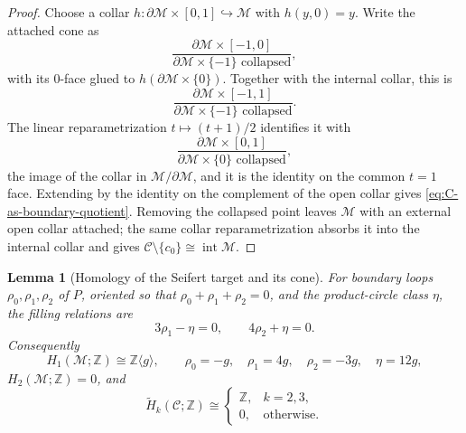 \documentclass[11pt,letterpaper]{article}
\numberwithin{equation}{section}
\newtheorem{lemma}[theorem]{Lemma}
\theoremstyle{definition}
\theoremstyle{remark}
\newcommand{\Z}{\mathbb Z}
\begin{document}
\begin{proof}
Choose a collar
\(h:\partial\mathcal M\times[0,1]\hookrightarrow\mathcal M\) with
\(h(y,0)=y\).  Write the attached cone as
\[
 \frac{\partial\mathcal M\times[-1,0]}
      {\partial\mathcal M\times\{-1\}\text{ collapsed}},
\]
with its \(0\)-face glued to \(h(\partial\mathcal M\times\{0\})\).
Together with the internal collar, this is
\[
 \frac{\partial\mathcal M\times[-1,1]}
      {\partial\mathcal M\times\{-1\}\text{ collapsed}}.
\]
The linear reparametrization \(t\mapsto(t+1)/2\) identifies it with
\[
 \frac{\partial\mathcal M\times[0,1]}
      {\partial\mathcal M\times\{0\}\text{ collapsed}},
\]
the image of the collar in
\(\mathcal M/\partial\mathcal M\), and it is the identity on the common
\(t=1\) face.  Extending by the identity on the complement of the open
collar gives \cref{eq:C-as-boundary-quotient}.  Removing the collapsed
point leaves \(\mathcal M\) with an external open collar attached; the
same collar reparametrization absorbs it into the internal collar and
gives \(\mathcal C\setminus\{c_0\}\cong\operatorname{int}\mathcal M\).
\end{proof}

\begin{lemma}[Homology of the Seifert target and its cone]
\label{lem:C-homology}
For boundary loops $\rho_0,\rho_1,\rho_2$ of $P$, oriented so that
$\rho_0+\rho_1+\rho_2=0$, and the product-circle class $\eta$, the filling
relations are
\begin{equation}
 3\rho_1-\eta=0,\qquad4\rho_2+\eta=0.
 \label{eq:meridian-relations}
\end{equation}
Consequently
\begin{equation}
 H_1(\mathcal M;\Z)\cong\Z\langle g\rangle,\qquad
 \rho_0=-g,\quad\rho_1=4g,\quad\rho_2=-3g,\quad\eta=12g,
 \label{eq:M-H1}
\end{equation}
$H_2(\mathcal M;\Z)=0$, and
\begin{equation}
 \widetilde H_k(\mathcal C;\Z)\cong
 \begin{cases}\Z,&k=2,3,\\0,&\text{otherwise}.
 \end{cases}
 \label{eq:C-homology}
\end{equation}
\end{lemma}
\end{document}
